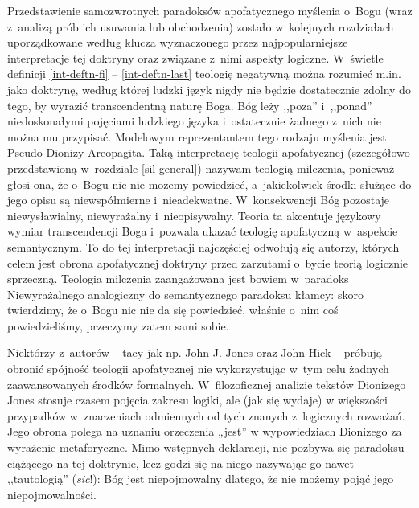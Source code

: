Przedstawienie samozwrotnych paradoksów apofatycznego myślenia o~Bo\-gu (wraz z~analizą prób ich usuwania lub obchodzenia) zostało w~kolejnych rozdziałach uporządkowane według klucza wyznaczonego przez najpopularniejsze interpretacje tej doktryny oraz związane z~nimi aspekty logiczne. W~świetle definicji \ref{int-deftn-fi} -- \ref{int-deftn-last} teologię negatywną można rozumieć m.in. jako doktrynę, według której ludzki język nigdy nie będzie dostatecznie zdolny do tego, by wyrazić transcendentną naturę Boga. Bóg leży ,,poza'' i~,,ponad'' niedoskonałymi pojęciami ludzkiego języka i~ostatecznie żadnego z~nich nie można mu przypisać. Modelowym reprezentantem tego rodzaju myślenia jest Pseudo-Dionizy Areopagita. Taką interpretację teologii apofatycznej (szczegółowo przedstawioną w~rozdziale \ref{sil-general}) nazywam teologią milczenia, ponieważ głosi ona, że o~Bogu nic nie możemy powiedzieć, a~jakiekolwiek środki służące do jego opisu są niewspółmierne i~nieadekwatne. W~konsekwencji Bóg pozostaje niewysławialny, niewyrażalny i~nieopisywalny. Teoria ta akcentuje językowy wymiar transcendencji Boga i~pozwala ukazać teologię apofatyczną w~aspekcie semantycznym. To do tej interpretacji najczęściej odwołują się autorzy, których celem jest obrona apofatycznej doktryny przed zarzutami o~bycie teorią logicznie sprzeczną. Teologia milczenia zaangażowana jest bowiem w~paradoks Niewyrażalnego analogiczny do semantycznego paradoksu kłamcy: skoro twierdzimy, że o~Bogu nic nie da się powiedzieć, właśnie o~nim coś powiedzieliśmy, przeczymy zatem sami sobie.

Niektórzy z~autorów -- tacy jak np. John J. Jones oraz John Hick -- próbują obronić spójność teologii apofatycznej nie wykorzystując w~tym celu żadnych zaawansowanych środków formalnych.
W~filozoficznej analizie tekstów Dionizego Jones stosuje czasem pojęcia zakresu logiki, ale (jak się wydaje) w większości przypadków w~znaczeniach odmiennych od tych znanych z~logicznych rozważań. Jego obrona polega na uznaniu orzeczenia „jest” w wypowiedziach Dionizego za wyrażenie metaforyczne. Mimo wstępnych deklaracji, nie pozbywa się paradoksu ciążącego na tej doktrynie, lecz godzi się na niego nazywając go nawet ,,tautologią'' (\textit{sic}!): Bóg jest niepojmowalny dlatego, że nie możemy pojąć jego niepojmowalności.

